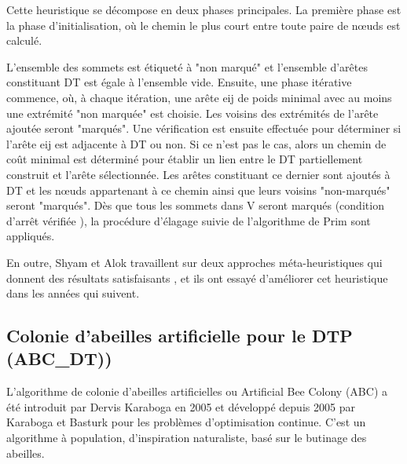 Cette heuristique se décompose en deux phases principales. La première phase est la phase d’initialisation, où le chemin le plus court entre toute paire de nœuds est calculé.

L’ensemble des sommets est étiqueté à "non marqué" et l’ensemble d’arêtes constituant DT est égale à l’ensemble vide. Ensuite, une phase itérative commence, où, à chaque itération, une arête eij de poids minimal avec au moins une extrémité "non marquée" est choisie. Les voisins des extrémités de l’arête ajoutée seront "marqués". Une vérification est ensuite effectuée pour déterminer si l’arête eij est adjacente à DT ou non. Si ce n’est pas le cas, alors un chemin de coût minimal est déterminé pour établir un lien entre le DT partiellement construit et l’arête sélectionnée. Les arêtes constituant ce dernier sont ajoutés à DT et les nœuds appartenant à ce chemin ainsi que leurs voisins "non-marqués" seront "marqués". Dès que tous les sommets dans V seront marqués (condition d’arrêt vérifiée ), la procédure d’élagage suivie de l’algorithme de Prim  sont appliqués.   
    
En outre, Shyam et Alok travaillent sur deux approches méta-heuristiques qui donnent des résultats satisfaisants , et ils ont essayé d’améliorer cet heuristique dans les années qui suivent.

\subsection{Colonie d'abeilles artificielle pour le DTP (ABC\_DT))}
L’algorithme de colonie d’abeilles artificielles ou Artificial Bee Colony (ABC) a été introduit par Dervis Karaboga en 2005 \cite{karaboga2005idea} et développé depuis 2005 par Karaboga et Basturk \cite{karaboga2008performance} pour les problèmes d’optimisation continue. C’est un algorithme à population, d’inspiration naturaliste, basé sur le butinage des abeilles.


